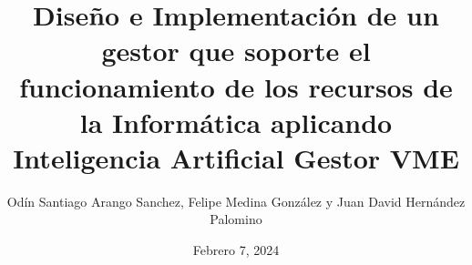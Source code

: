 \documentclass{beamer}
\title{Diseño e Implementación de un gestor que soporte el
funcionamiento de los recursos de la Informática aplicando
Inteligencia Artificial \break
Gestor VME}
\institute{Universidad Central}
\date{Febrero 7, 2024}
\author{Odín Santiago Arango Sanchez,
Felipe Medina González y
Juan David Hernández Palomino}
\begin{document}
\begin{frame}
  \titlepage
\end{frame}





\end{document}
